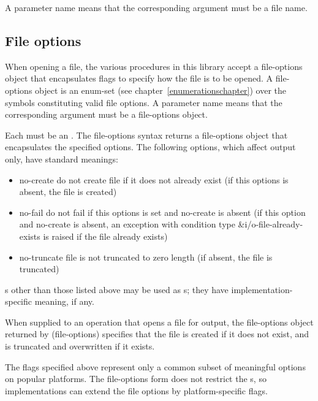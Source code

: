 A  parameter name means that the
corresponding argument must be a file name.

\subsection{File options}
\label{fileoptionssection}

When opening a file, the various procedures in this library accept a
{\cf file-options} object that encapsulates flags to specify how
the file is to be opened. A {\cf file-options} object is an enum-set
(see chapter~\ref{enumerationschapter}) over the symbols constituting
valid file options.
A  parameter name means that the
corresponding argument must be a file-options object.

\begin{entry}{%
}

Each  must be an .
The {\cf file-options} syntax returns a file-options object that 
encapsulates the
specified options. The following options, which affect output
only, have standard meanings:

\begin{itemize}   
\item {\cf no-create} do not create file if it does not already exist
  (if this options is absent, the file is created)
\item {\cf no-fail} do not fail if this options is set and {\cf
    no-create} is absent (if this option and {\cf no-create} is
  absent, an exception with condition type
  {\cf\&i/o-file-already-exists} is raised if the file already exists)
\item {\cf no-truncate}
  file is not truncated to zero length (if absent, the file is truncated)
\end{itemize}

s
other than those listed above may be used as s;
they have implementation-specific meaning, if any.

When supplied to an operation that opens a file for output, the
file-options object returned by {\cf (file-options)} specifies that
the file is created if it does not exist, and is truncated and
overwritten if it exists.

\begin{rationale}
  The flags specified above represent only a common subset of
  meaningful options on popular platforms.  The {\cf file-options}
  form does not restrict the s, so 
  implementations can extend the file options by platform-specific
  flags.
\end{rationale}
\end{entry}   


